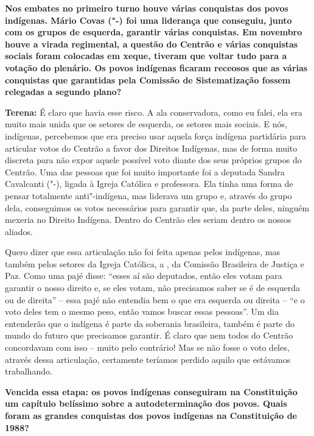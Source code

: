 \textbf{Nos embates no primeiro turno houve várias conquistas dos povos
indígenas. Mário Covas ("-) foi uma liderança que conseguiu, junto
com os grupos de esquerda, garantir várias conquistas. Em novembro houve
a virada regimental, a questão do Centrão e várias conquistas sociais
foram colocadas em xeque, tiveram que voltar tudo para a votação do
plenário. Os povos indígenas ficaram receosos que as várias conquistas
que garantidas pela Comissão de Sistematização fossem relegadas a
segundo plano?}

\textbf{Terena:} É claro que havia esse risco. A ala conservadora, como
eu falei, ela era muito mais unida que os setores de esquerda, os
setores mais sociais. E nós, indígenas, percebemos que era preciso usar
aquela força indígena partidária para articular votos do Centrão a favor
dos Direitos Indígenas, mas de forma muito discreta para não expor
aquele possível voto diante dos seus próprios grupos do Centrão. Uma das
pessoas que foi muito importante foi a deputada Sandra Cavalcanti
("-), ligada à Igreja Católica e professora. Ela tinha uma forma de
pensar totalmente anti"-indígena, mas liderava um grupo e, através do
grupo dela, conseguimos os votos necessários para garantir que, da parte
deles, ninguém mexeria no Direito Indígena. Dentro do Centrão eles
seriam dentro os nossos aliados.

Quero dizer que essa articulação não foi feita apenas pelos indígenas,
mas também pelos setores da Igreja Católica, a , da Comissão
Brasileira de Justiça e Paz. Como uma pajé disse: ``esses aí são
deputados, então eles votam para garantir o nosso direito e, se eles
votam, não precisamos saber se é de esquerda ou de direita'' -- essa
pajé não entendia bem o que era esquerda ou direita -- ``e o voto deles
tem o mesmo peso, então vamos buscar essas pessoas''. Um dia entenderão
que o indígena é parte da soberania brasileira, também é parte do mundo
do futuro que precisamos garantir. É claro que nem todos do Centrão
concordavam com isso -- muito pelo contrário! Mas se não fosse o voto
deles, através dessa articulação, certamente teríamos perdido aquilo que
estávamos trabalhando.

\textbf{Vencida essa etapa: os povos indígenas conseguiram na
Constituição um capítulo belíssimo sobre a autodeterminação dos povos.
Quais foram as grandes conquistas dos povos indígenas na Constituição de
1988?}

